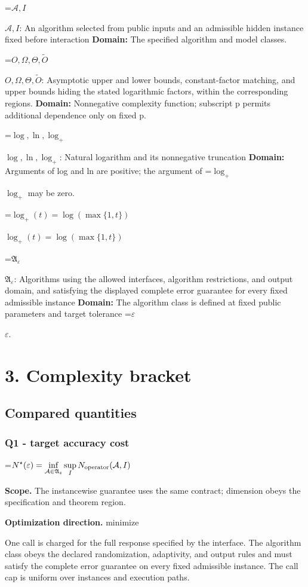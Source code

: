 \documentclass[10pt,a4paper]{article}
\newcommand{\AtlasMath}[1]{\par\begingroup\centering\setbox0=\hbox{$\displaystyle #1$}\ifdim\wd0>1.4\linewidth\typeout{ATLAS WIDE FORMULA: \the\wd0}\fi\ifdim\wd0>\linewidth\resizebox{\linewidth}{!}{\box0}\else\box0\fi\par\endgroup}
\newcommand{\AtlasInlineMath}[1]{\begingroup\setbox0=\hbox{$#1$}\ifdim\wd0>.4\linewidth\endgroup\AtlasMath{#1}\else\endgroup$#1$\fi}
\begin{document}
\AtlasInlineMath{\mathcal A,I}: An algorithm selected from public inputs and an admissible hidden instance fixed before interaction \textbf{Domain:} The specified algorithm and model classes.

\AtlasInlineMath{O,\Omega,\Theta,\widetilde O}: Asymptotic upper and lower bounds, constant-factor matching, and upper bounds hiding the stated logarithmic factors, within the corresponding regions. \textbf{Domain:} Nonnegative complexity function; subscript p permits additional dependence only on fixed p.

\AtlasInlineMath{\log,\ln,\log_+}: Natural logarithm and its nonnegative truncation \textbf{Domain:} Arguments of log and ln are positive; the argument of \AtlasInlineMath{\log_+} may be zero.

\AtlasInlineMath{\log_+(t)=\log(\max\{1,t\})}

\AtlasInlineMath{\mathfrak A_\varepsilon}: Algorithms using the allowed interfaces, algorithm restrictions, and output domain, and satisfying the displayed complete error guarantee for every fixed admissible instance \textbf{Domain:} The algorithm class is defined at fixed public parameters and target tolerance \AtlasInlineMath{\varepsilon}.

\section{3. Complexity bracket}
\subsection{Compared quantities}
\subsubsection{Q1 - target accuracy cost}
\AtlasMath{N^\star(\varepsilon)=\inf_{\mathcal A\in\mathfrak A_\varepsilon}\sup_I N_{\rm operator}(\mathcal A,I)}
\textbf{Scope.} The instancewise guarantee uses the same contract; dimension obeys the specification and theorem region.

\textbf{Optimization direction.} minimize

One call is charged for the full response specified by the interface. The algorithm class obeys the declared randomization, adaptivity, and output rules and must satisfy the complete error guarantee on every fixed admissible instance. The call cap is uniform over instances and execution paths.
\end{document}
